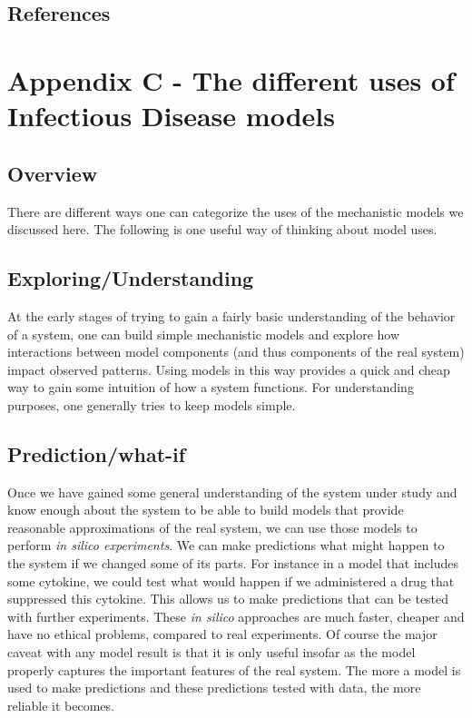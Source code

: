 \documentclass[]{book}
\theoremstyle{definition}
\theoremstyle{definition}
\theoremstyle{definition}
\theoremstyle{remark}
\begin{document}
\section{References}\label{references-20}

\chapter{Appendix C - The different uses of Infectious Disease
models}\label{appendix-c---the-different-uses-of-infectious-disease-models}

\section{Overview}\label{overview-1}

There are different ways one can categorize the uses of the mechanistic
models we discussed here. The following is one useful way of thinking
about model uses.

\section{Exploring/Understanding}\label{exploringunderstanding}

At the early stages of trying to gain a fairly basic understanding of
the behavior of a system, one can build simple mechanistic models and
explore how interactions between model components (and thus components
of the real system) impact observed patterns. Using models in this way
provides a quick and cheap way to gain some intuition of how a system
functions. For understanding purposes, one generally tries to keep
models simple.

\section{Prediction/what-if}\label{predictionwhat-if}

Once we have gained some general understanding of the system under study
and know enough about the system to be able to build models that provide
reasonable approximations of the real system, we can use those models to
perform \emph{in silico experiments}. We can make predictions what might
happen to the system if we changed some of its parts. For instance in a
model that includes some cytokine, we could test what would happen if we
administered a drug that suppressed this cytokine. This allows us to
make predictions that can be tested with further experiments. These
\emph{in silico} approaches are much faster, cheaper and have no ethical
problems, compared to real experiments. Of course the major caveat with
any model result is that it is only useful insofar as the model properly
captures the important features of the real system. The more a model is
used to make predictions and these predictions tested with data, the
more reliable it becomes.
\end{document}
